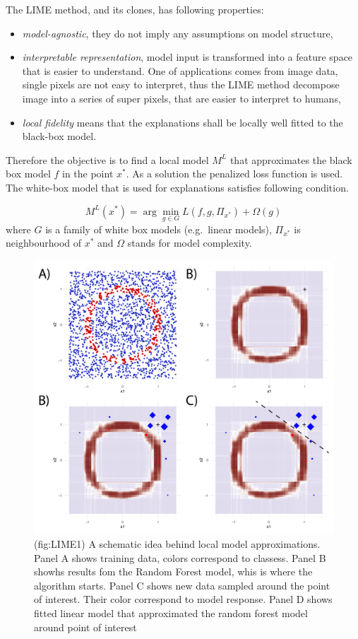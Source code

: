 \documentclass[]{book}
\providecommand{\tightlist}{%
  \setlength{\itemsep}{0pt}\setlength{\parskip}{0pt}}
\theoremstyle{definition}
\theoremstyle{definition}
\theoremstyle{definition}
\theoremstyle{remark}
\begin{document}
The LIME method, and its clones, has following properties:

\begin{itemize}
\tightlist
\item
  \emph{model-agnostic}, they do not imply any assumptions on model
  structure,
\item
  \emph{interpretable representation}, model input is transformed into a
  feature space that is easier to understand. One of applications comes
  from image data, single pixels are not easy to interpret, thus the
  LIME method decompose image into a series of super pixels, that are
  easier to interpret to humans,
\item
  \emph{local fidelity} means that the explanations shall be locally
  well fitted to the black-box model.
\end{itemize}

Therefore the objective is to find a local model \(M^L\) that
approximates the black box model \(f\) in the point \(x^*\). As a
solution the penalized loss function is used. The white-box model that
is used for explanations satisfies following condition.

\[
M^L(x^*) = \arg \min_{g \in G} L(f, g, \Pi_{x^*}) + \Omega (g) 
\] where \(G\) is a family of white box models (e.g.~linear models),
\(\Pi_{x^*}\) is neighbourhood of \(x^*\) and \(\Omega\) stands for
model complexity.

\begin{figure}

{\centering \includegraphics[width=0.7\linewidth]{figure/circle_4panels} 

}

\caption{(fig:LIME1) A schematic idea behind local model approximations. Panel A shows training data, colors correspond to classess. Panel B showhs results fom the Random Forest model, whis is where the algorithm starts. Panel C shows new data sampled around the point of interest. Their color correspond to model response. Panel D shows fitted linear model that approximated the random forest model around point of interest}\label{fig:LIME1}
\end{figure}
\end{document}
